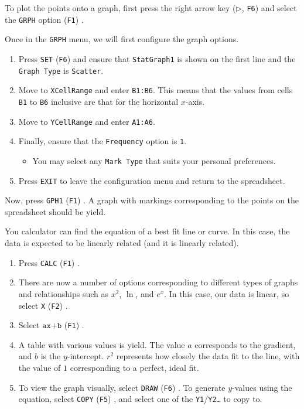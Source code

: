\documentclass[a5paper]{memoir}
\def\code#1{\texttt{#1}}
\def\Fone{(\code{F1}) }
\def\Ftwo{(\code{F2}) }
\def\Ffive{(\code{F5}) }
\def\Fsix{(\code{F6}) }
\begin{document}
To plot the points onto a graph, first press the right arrow key ($\triangleright$, \code{F6}) and select the \code{GRPH} option \Fone.

Once in the \code{GRPH} menu, we will first configure the graph options. 
\begin{enumerate}
	\item Press \code{SET} \Fsix and ensure that \code{StatGraph1} is shown on the first line and the \code{Graph Type} is \code{Scatter}.
	\item Move to \code{XCellRange} and enter \code{B1:B6}. This means that the values from cells \code{B1} to \code{B6} inclusive are that for the horizontal $x$-axis.
	\item Move to \code{YCellRange} and enter \code{A1:A6}.
	\item Finally, ensure that the \code{Frequency} option is \code{1}.
	\begin{itemize}
		\item You may select any \code{Mark Type} that suits your personal preferences.
	\end{itemize}
	\item Press \code{EXIT} to leave the configuration menu and return to the spreadsheet.
\end{enumerate}

Now, press \code{GPH1} \Fone. A graph with markings corresponding to the points on the spreadsheet should be yield.

You calculator can find the equation of a best fit line or curve. In this case, the data is expected to be linearly related (and it is linearly related).

\begin{enumerate}
	\item Press \code{CALC} \Fone.
	\item There are now a number of options corresponding to different types of graphs and relationships such as $x^2$, $\ln$, and $e^x$. In this case, our data is linear, so select \code{X} \Ftwo.
	\item Select $\code{ax+b}$ \Fone.
	\item A table with various values is yield. The value $a$ corresponds to the gradient, and $b$ is the $y$-intercept. $r^2$ represents how closely the data fit to the line, with the value of $1$ corresponding to a perfect, ideal fit.
	\item To view the graph visually, select \code{DRAW} \Fsix. To generate $y$-values using the equation, select \code{COPY} \Ffive, and select one of the \code{Y1}/\code{Y2\dots} to copy to.
\end{enumerate}
\end{document}
